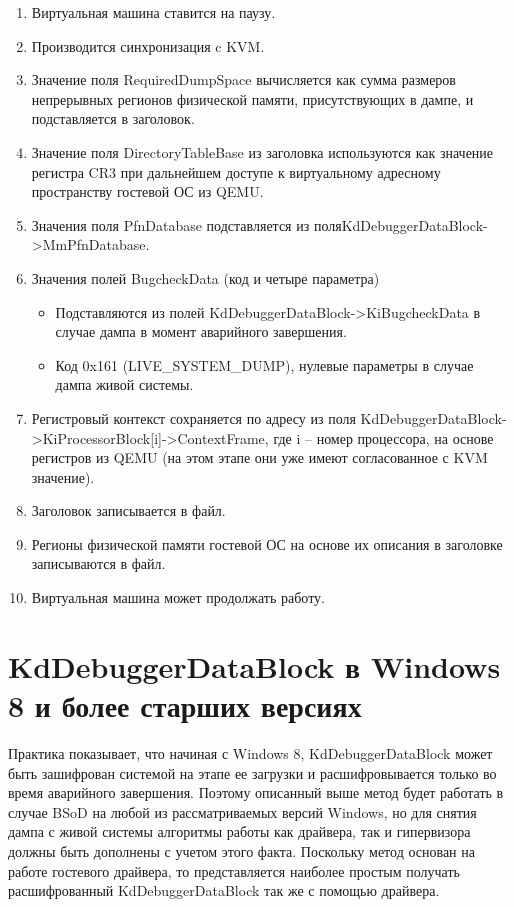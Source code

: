 \documentclass{mipt-thesis-bs}
\begin{document}
\begin{enumerate}
    \item Виртуальная машина ставится на паузу.
    \item Производится синхронизация c KVM.
    \item Значение поля RequiredDumpSpace вычисляется как сумма размеров непрерывных регионов физической памяти, присутствующих в дампе, и подставляется в заголовок.
    \item Значение поля DirectoryTableBase из заголовка используются как значение регистра CR3 при дальнейшем доступе к виртуальному адресному пространству гостевой ОС из QEMU.
    \item Значения поля PfnDatabase подставляется из поля\newline KdDebuggerDataBlock->MmPfnDatabase.
    \item Значения полей BugcheckData (код и четыре параметра)
    \begin{itemize}
        \item Подставляются из полей KdDebuggerDataBlock->KiBugcheckData в случае дампа в момент аварийного завершения.
        \item Код 0x161 (LIVE{\_}SYSTEM{\_DUMP}), нулевые параметры в случае дампа живой системы.
    \end{itemize}
    \item Регистровый контекст сохраняется по адресу из поля KdDebuggerDataBlock->KiProcessorBlock[i]->ContextFrame, где i -- номер процессора, на основе регистров из QEMU (на этом этапе они уже имеют согласованное с KVM значение).
    \item Заголовок записывается в файл.
    \item Регионы физической памяти гостевой ОС на основе их описания в заголовке записываются в файл.
    \item Виртуальная машина может продолжать работу.
\end{enumerate}

\section*{KdDebuggerDataBlock в Windows 8 и более старших версиях}

Практика показывает, что начиная с Windows 8, KdDebuggerDataBlock может быть зашифрован системой на этапе ее загрузки и расшифровывается только во время аварийного завершения. Поэтому описанный выше метод будет работать в случае BSoD на любой из рассматриваемых версий Windows, но для снятия дампа с живой системы алгоритмы работы как драйвера, так и гипервизора должны быть дополнены с учетом этого факта. Поскольку метод основан на работе гостевого драйвера, то представляется наиболее простым получать расшифрованный KdDebuggerDataBlock так же с помощью драйвера.
\end{document}
